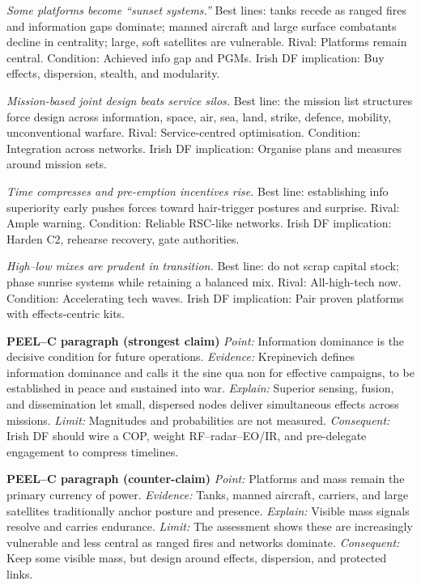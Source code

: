 \textit{Some platforms become “sunset systems.”} Best lines: tanks recede as ranged fires and information gaps dominate; manned aircraft and large surface combatants decline in centrality; large, soft satellites are vulnerable. Rival: Platforms remain central. Condition: Achieved info gap and PGMs. Irish DF implication: Buy effects, dispersion, stealth, and modularity.

\textit{Mission-based joint design beats service silos.} Best line: the mission list structures force design across information, space, air, sea, land, strike, defence, mobility, unconventional warfare. Rival: Service-centred optimisation. Condition: Integration across networks. Irish DF implication: Organise plans and measures around mission sets.

\textit{Time compresses and pre-emption incentives rise.} Best line: establishing info superiority early pushes forces toward hair-trigger postures and surprise. Rival: Ample warning. Condition: Reliable RSC-like networks. Irish DF implication: Harden C2, rehearse recovery, gate authorities.

\textit{High–low mixes are prudent in transition.} Best line: do not scrap capital stock; phase sunrise systems while retaining a balanced mix. Rival: All-high-tech now. Condition: Accelerating tech waves. Irish DF implication: Pair proven platforms with effects-centric kits.

\textbf{PEEL–C paragraph (strongest claim)}
\textit{Point:} Information dominance is the decisive condition for future operations.
\textit{Evidence:} Krepinevich defines information dominance and calls it the sine qua non for effective campaigns, to be established in peace and sustained into war.
\textit{Explain:} Superior sensing, fusion, and dissemination let small, dispersed nodes deliver simultaneous effects across missions.
\textit{Limit:} Magnitudes and probabilities are not measured.
\textit{Consequent:} Irish DF should wire a COP, weight RF–radar–EO/IR, and pre-delegate engagement to compress timelines.

\textbf{PEEL–C paragraph (counter-claim)}
\textit{Point:} Platforms and mass remain the primary currency of power.
\textit{Evidence:} Tanks, manned aircraft, carriers, and large satellites traditionally anchor posture and presence.
\textit{Explain:} Visible mass signals resolve and carries endurance.
\textit{Limit:} The assessment shows these are increasingly vulnerable and less central as ranged fires and networks dominate.
\textit{Consequent:} Keep some visible mass, but design around effects, dispersion, and protected links.

